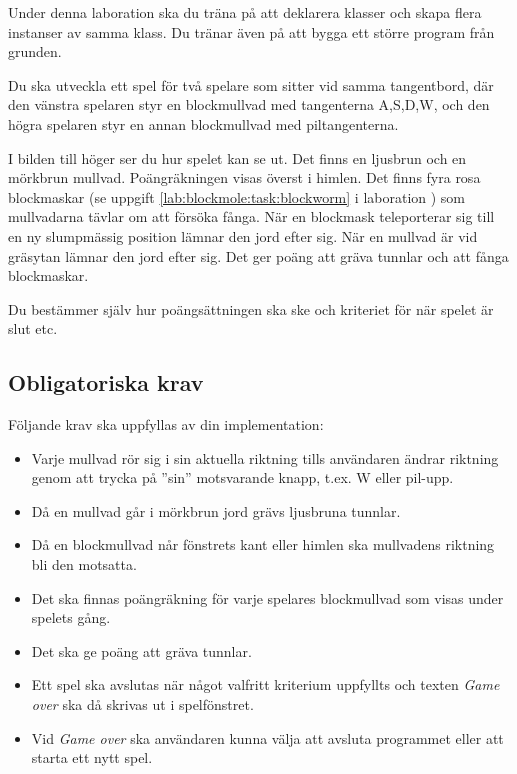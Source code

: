 {
\setlength{\currentparskip}{\parskip}%
\setlength{\currentparindent}{\parindent}%
\hfill%
\begin{minipage}{0.4\textwidth}
\setlength{\parskip}{\currentparskip}%
\setlength{\parindent}{\currentparindent}%
\noindent Under denna laboration ska du träna på att deklarera klasser och skapa flera instanser av samma klass. Du tränar även på att bygga ett större program från grunden.

Du ska utveckla ett spel för två spelare som sitter vid samma tangentbord, där den vänstra spelaren styr en blockmullvad med tangenterna A,S,D,W, och den högra spelaren styr en annan blockmullvad med piltangenterna.

I bilden till höger ser du hur spelet kan se ut. Det finns en ljusbrun och en mörkbrun mullvad. Poängräkningen visas överst i himlen. Det finns fyra rosa blockmaskar (se uppgift \ref{lab:blockmole:task:blockworm} i laboration ) som mullvadarna tävlar om att försöka fånga. När en blockmask teleporterar sig till en ny slumpmässig position lämnar den jord efter sig. När en mullvad är vid gräsytan lämnar den jord efter sig.
Det ger poäng att gräva tunnlar och att fånga blockmaskar.

Du bestämmer själv hur poängsättningen ska ske och kriteriet för när spelet är slut etc.
\end{minipage}%
}



\subsection{Obligatoriska krav}

Följande krav ska uppfyllas av din implementation:
\begin{itemize}[nosep, label={$\square$},]
\item Varje mullvad rör sig i sin aktuella riktning tills användaren ändrar riktning genom att trycka på ''sin'' motsvarande knapp, t.ex. W eller pil-upp.
\item Då en mullvad går i mörkbrun jord grävs ljusbruna tunnlar.
\item Då en blockmullvad når fönstrets kant eller himlen ska mullvadens riktning bli den motsatta.
\item Det ska finnas poängräkning för varje spelares blockmullvad som visas under spelets gång.
\item Det ska ge poäng att gräva tunnlar.
\item Ett spel ska avslutas när något valfritt kriterium uppfyllts och texten \emph{Game over} ska då skrivas ut i spelfönstret.
\item Vid \emph{Game over} ska användaren kunna välja att avsluta programmet eller att starta ett nytt spel.
\end{itemize}

